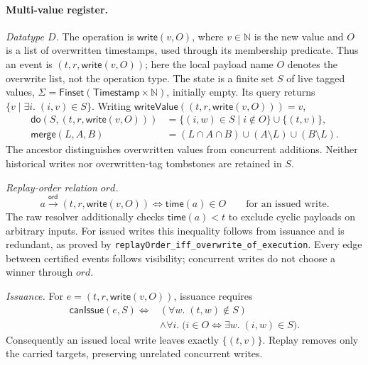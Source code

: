 \documentclass[11pt]{article}
\theoremstyle{definition}
\newcommand{\N}{\mathbb N}
\newcommand{\doop}{\mathsf{do}}
\newcommand{\merge}{\mathsf{merge}}
\newcommand{\ord}{\mathrel{\xrightarrow{\mathsf{ord}}}}
\newcommand{\lean}[1]{\texttt{#1}}
\begin{document}
\paragraph{Multi-value register.}

\emph{Datatype $D$.} The operation is $\mathsf{write}(v,O)$, where $v\in\N$ is the new value and
$O$ is a list of overwritten timestamps, used through its membership predicate.
Thus an event is $(t,r,\mathsf{write}(v,O))$; here the local payload name $O$
denotes the overwrite list, not the operation type.
The state is a finite set $S$ of live tagged values,
$\Sigma=\mathsf{Finset}(\mathsf{Timestamp}\times\N)$, initially empty.
Its query returns $\{v\mid\exists i.\;(i,v)\in S\}$.
Writing $\mathsf{writeValue}((t,r,\mathsf{write}(v,O)))=v$,
\[
\begin{aligned}
 \doop(S,(t,r,\mathsf{write}(v,O)))&=\{(i,w)\in S\mid i\notin O\}\cup\{(t,v)\},\\
 \merge(L,A,B)&=(L\cap A\cap B)
     \cup(A\setminus L)\cup(B\setminus L).
\end{aligned}
\]
The ancestor distinguishes overwritten values from concurrent additions.
Neither historical writes nor overwritten-tag tombstones are retained in $S$.

\emph{Replay-order relation $ord$.}
\[
 a\ord(t,r,\mathsf{write}(v,O))
   \Longleftrightarrow \mathsf{time}(a)\in O
   \qquad\text{for an issued write}.
\]
The raw resolver additionally checks $\mathsf{time}(a)<t$ to exclude cyclic
payloads on arbitrary inputs. For issued writes this inequality follows from
issuance and is redundant, as proved by \lean{replayOrder\_iff\_overwrite\_of\_execution}.
Every edge between certified events follows visibility; concurrent writes
do not choose a winner through $ord$.

\emph{Issuance.} For $e=(t,r,\mathsf{write}(v,O))$, issuance requires
\[
\begin{aligned}
 \mathsf{canIssue}(e,S)\Longleftrightarrow{}&
   (\forall w.\;(t,w)\notin S)\\
   &\land\forall i.\;\bigl(i\in O\Longleftrightarrow
       \exists w.\;(i,w)\in S\bigr).
\end{aligned}
\]
Consequently an issued local write leaves exactly $\{(t,v)\}$.
Replay removes only the carried targets, preserving unrelated concurrent writes.
\end{document}
